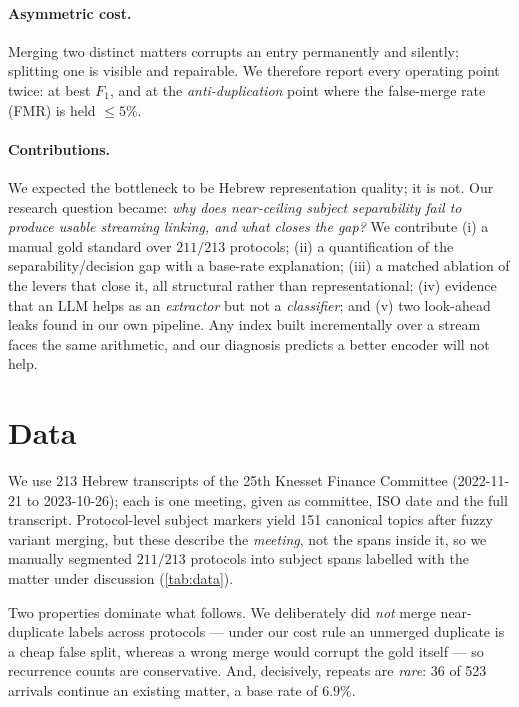 \documentclass[11pt]{article}
\begin{document}
\paragraph{Asymmetric cost.}
Merging two distinct matters corrupts an entry permanently and silently; splitting one is
visible and repairable. We therefore report every operating point twice: at best $F_1$, and
at the \emph{anti-duplication} point where the false-merge rate (FMR) is held $\le 5\%$.

\paragraph{Contributions.}
We expected the bottleneck to be Hebrew representation quality; it is not. Our research
question became: \emph{why does near-ceiling subject separability fail to produce usable
streaming linking, and what closes the gap?} We contribute (i) a manual gold standard over
$211/213$ protocols; (ii) a quantification of the separability/decision gap with a base-rate
explanation; (iii) a matched ablation of the levers that close it, all structural rather
than representational; (iv) evidence that an LLM helps as an \emph{extractor} but not a
\emph{classifier}; and (v) two look-ahead leaks found in our own pipeline. Any index built
incrementally over a stream faces the same arithmetic, and our diagnosis predicts a better
encoder will not help.

\section{Data}
\label{sec:data}

We use 213 Hebrew transcripts of the 25th Knesset Finance Committee (2022-11-21 to
2023-10-26); each is one meeting, given as committee, ISO date and the full transcript.
Protocol-level subject markers yield 151 canonical topics after fuzzy variant merging, but
these describe the \emph{meeting}, not the spans inside it, so we manually segmented
$211/213$ protocols into subject spans labelled with the matter under discussion
(\cref{tab:data}).

Two properties dominate what follows. We deliberately did \emph{not} merge near-duplicate
labels across protocols --- under our cost rule an unmerged duplicate is a cheap false
split, whereas a wrong merge would corrupt the gold itself --- so recurrence counts are
conservative. And, decisively, repeats are \emph{rare}: 36 of 523 arrivals continue an
existing matter, a base rate of $6.9\%$.
\end{document}
